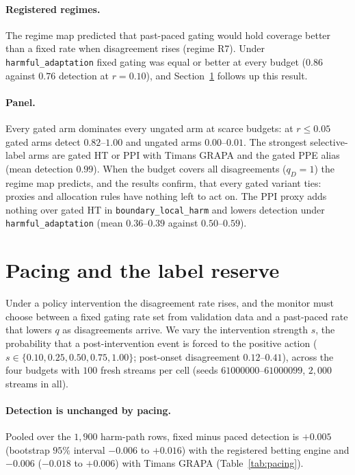 \paragraph{Registered regimes.}
The regime map predicted that past-paced gating would hold coverage better than a fixed rate when disagreement rises (regime R7). Under \texttt{harmful\_adaptation} fixed gating was equal or better at every budget
($0.86$ against $0.76$ detection at $r=0.10$), and Section~\ref{sec:pacing} follows up this result.

\paragraph{Panel.}
Every gated arm dominates every ungated arm at scarce budgets: at $r\le0.05$ gated arms detect $0.82$--$1.00$ and ungated arms $0.00$--$0.01$.
The strongest selective-label arms are gated HT or PPI with Timans GRAPA and the gated PPE alias (mean detection $0.99$).
When the budget covers all disagreements ($q_D=1$) the regime map predicts, and the results confirm, that every gated variant ties: proxies and allocation rules have nothing left to act on.
The PPI proxy adds nothing over gated HT in \texttt{boundary\_local\_harm} and lowers detection under \texttt{harmful\_adaptation} (mean $0.36$--$0.39$ against $0.50$--$0.59$).

\section{Pacing and the label reserve}\label{sec:pacing}

Under a policy intervention the disagreement rate rises, and the monitor must choose between a fixed gating rate set from validation data and a past-paced rate that lowers $q$ as disagreements arrive.
We vary the intervention strength $s$, the probability that a post-intervention event is forced to the positive action
($s\in\{0.10,0.25,0.50,0.75,1.00\}$; post-onset disagreement $0.12$--$0.41$), across the four budgets with $100$ fresh streams per cell (seeds $61000000$--$61000099$, $2{,}000$ streams in all).

\paragraph{Detection is unchanged by pacing.}
Pooled over the $1{,}900$ harm-path rows, fixed minus paced detection is $+0.005$ (bootstrap $95\%$ interval $-0.006$ to $+0.016$) with the registered betting engine
and $-0.006$ ($-0.018$ to $+0.006$) with Timans GRAPA (Table~\ref{tab:pacing}).

